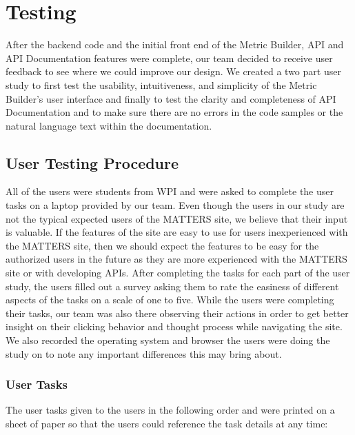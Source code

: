 \chapter{Testing}

After the backend code and the initial front end of the Metric Builder, API and API Documentation features were complete, our team decided to receive user feedback to see where we could improve our design. We created a two part user study to first test the usability, intuitiveness, and simplicity of the Metric Builder’s user interface and finally to test the clarity and completeness of API Documentation and to make sure there are no errors in the code samples or the natural language text within the documentation. 

\section{User Testing Procedure}

All of the users were students from WPI and were asked to complete the user tasks on a laptop provided by our team. Even though the users in our study are not the typical expected users of the MATTERS site, we believe that their input is valuable. If the features of the site are easy to use for users inexperienced with the MATTERS site, then we should expect the features to be easy for the authorized users in the future as they are more experienced with the MATTERS site or with developing APIs. After completing the tasks for each part of the user study, the users filled out a survey asking them to rate the easiness of different aspects of the tasks on a scale of one to five. While the users were completing their tasks, our team was also there observing their actions in order to get better insight on their clicking behavior and thought process while navigating the site. We also recorded the operating system and browser the users were doing the study on to note any important differences this may bring about.

	\subsection{User Tasks}
	
	The user tasks given to the users in the following order and were printed on a sheet of paper so that the users could reference the task details at any time:
	
